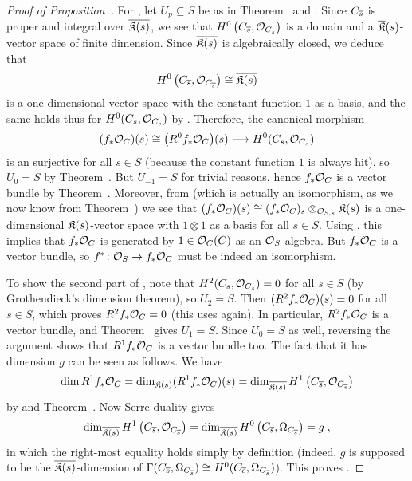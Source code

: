 \documentclass[a4paper,parskip=half,numbers=enddot, DIV=12]{scrreprt}
\begin{document}
\begin{proof}[Proof of Proposition~]
	For , let $U_p\subseteq S$ be as in Theorem~ and . %
	Since $C_{\overline{s}}$ is proper and integral over $\overline{\mathfrak{K}(s)}$, we see that $H^0\left(C_{\overline{s}},\mathcal{O}_{C_{\overline{s}}}\right)$ is a domain and a $\overline{\mathfrak{K}}(s)$-vector space of finite dimension. Since $\overline{\mathfrak{K}(s)}$ is algebraically closed, we deduce that
	\begin{align*}
		H^0\left(C_{\overline{s}},\mathcal{O}_{C_{\overline{s}}}\right)\cong \overline{\mathfrak{K}(s)}
	\end{align*}
	is a one-dimensional vector space with the constant function $1$ as a basis, and the same holds thus for $H^0(C_s,\mathcal{O}_{C_s})$ by . Therefore, the canonical morphism
	\begin{align}\lbl{eq:H0OC}
		(f_*\Oo_C)(s)\cong\big(R^0f_*\Oo_C\big)(s)\morphism H^0(C_s,\Oo_{C_s})
	\end{align}
	is an surjective for all $s\in S$ (because the constant function $1$ is always hit), so $U_0=S$ by Theorem~. But $U_{-1}=S$ for trivial reasons, hence $f_*\mathcal{O}_C$ is a vector bundle by Theorem~. Moreover, from  (which is actually an isomorphism, as we now know from Theorem~) we see that $(f_*\mathcal{O}_C)(s)\cong (f_*\mathcal{O}_C)_s\otimes_{\mathcal{O}_{S,s}}\mathfrak{K}(s)$ is a one-dimensional $\mathfrak{K}(s)$-vector space with $1\otimes 1$ as a basis for all $s\in S$. Using \cite[Lemma~1.5.1]{alg2}, this implies that $f_*\mathcal{O}_C$ is generated by $1\in\mathcal{O}_C(C)$ as an $\mathcal{O}_S$-algebra. But $f_*\mathcal{O}_C$ is a vector bundle, so $f^*\colon \Oo_S\morphism f_*\Oo_C$ must be indeed an isomorphism.
	
	To show the second part of , note that $H^2(C_s,\mathcal{O}_{C_s})=0$ for all $s\in S$ (by Grothendieck's dimension theorem), so $U_2=S$. Then $(R^2f_*\mathcal{O}_C)(s)=0$ for all $s\in S$, which proves $R^2f_*\mathcal{O}_C=0$ (this uses \cite[Lemma~1.5.1]{alg2} again). In particular, $R^2f_*\mathcal{O}_C$ is a vector bundle, and Theorem~ gives $U_1=S$. Since $U_0=S$ as well, reversing the argument shows that $R^1f_*\mathcal{O}_C$ is a vector bundle too. The fact that it has dimension $g$ can be seen as follows. We have
	\begin{align*}
		\dim R^1f_*\mathcal{O}_C=\dim_{\mathfrak{K}(s)}(R^1f_*\mathcal{O}_C)(s)=\dim_{\overline{\mathfrak{K}(s)}}H^1\left(C_{\overline{s}},\mathcal{O}_{C_{\overline{s}}}\right)
	\end{align*}
	by  and Theorem~. Now Serre duality gives
	\begin{align*}
		\dim_{\overline{\mathfrak{K}(s)}}H^1\left(C_{\overline{s}},\mathcal{O}_{C_{\overline{s}}}\right)=\dim_{\overline{\mathfrak{K}(s)}}H^0\left(C_{\overline{s}},\Omega_{C_{\overline{s}}}\right)=g\;,
	\end{align*}
	in which the right-most equality holds simply by definition (indeed, $g$ is supposed to be the $\overline{\mathfrak{K}(s)}$-dimension of $\Gamma(C_{\overline{s}},\Omega_{C_{\overline{s}}})\cong H^0(C_{\overline{c}},\Omega_{C_{\overline{s}}})$). This proves .
	

\end{proof}
\end{document}

